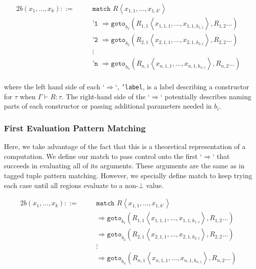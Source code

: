 \documentclass{article}
\begin{document}
\begin{alignat*}{2}
b(x_1, \dots, x_k) ::=&\, &&\texttt{match } R \left\langle x_{1,1}, \dots, x_{1,k'} \right\rangle \\
    & &&\texttt{'1 } \Rightarrow \texttt{goto}_{b_1} \left( R_{1,1} \left\langle x_{1,1,1}, \dots, x_{1,1,k_{1,1}} \right\rangle, R_{1,2} \dots\right) \\
    & &&\texttt{'2 } \Rightarrow \texttt{goto}_{b_2} \left( R_{2,1} \left\langle x_{2,1,1}, \dots, x_{2,1,k_{2,1}} \right\rangle, R_{2,2} \dots\right) \\
    & &&\vdots \\
    & &&\texttt{'n } \Rightarrow \texttt{goto}_{b_n} \left( R_{n,1} \left\langle x_{n,1,1}, \dots, x_{n,1,k_{n,1}} \right\rangle, R_{n,2} \dots\right) \\
\end{alignat*}

where the left hand side of each `$\Rightarrow$`, \texttt{'label}, is a label describing a constructor for $\tau$ when $\Gamma \vdash R : \tau$. The right-hand side of the `$\Rightarrow$` potentially describes naming parts of each constructor or passing additional parameters needed in $b_i$.

\subsubsection{First Evaluation Pattern Matching}

Here, we take advantage of the fact that this is a theoretical representation of a computation. We define our match to pass control onto the first `$\Rightarrow$` that succeeds in evaluating all of its arguments. These arguments are the same as in tagged tuple pattern matching. However, we specially define match to keep trying each case until all regions evaluate to a non-$\bot$ value.

\begin{alignat*}{2}
b(x_1, \dots, x_k) ::=&\, &&\texttt{match } R \left\langle x_{1,1}, \dots, x_{1,k'} \right\rangle \\
    & && \Rightarrow \texttt{goto}_{b_1} \left( R_{1,1} \left\langle x_{1,1,1}, \dots, x_{1,1,k_{1,1}} \right\rangle, R_{1,2} \dots\right) \\
    & &&  \Rightarrow \texttt{goto}_{b_2} \left( R_{2,1} \left\langle x_{2,1,1}, \dots, x_{2,1,k_{2,1}} \right\rangle, R_{2,2} \dots\right) \\
    & && \vdots \\
    & && \Rightarrow \texttt{goto}_{b_n} \left( R_{n,1} \left\langle x_{n,1,1}, \dots, x_{n,1,k_{n,1}} \right\rangle, R_{n,2} \dots\right) \\
\end{alignat*}
\end{document}

